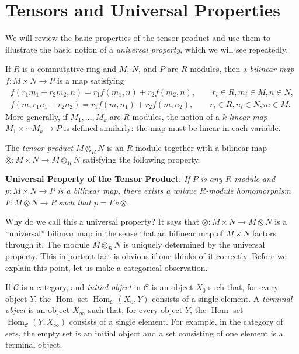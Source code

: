 \documentclass[12pt,reqno]{book}%
\theoremstyle{definition}
\theoremstyle{remark}
\theoremstyle{theorem}
\theoremstyle{remark}
\DeclareMathOperator{\Hom}{Hom}
\begin{document}
\chapter{Tensors and Universal Properties}\label{}%
We will review the basic properties of the tensor product and use them to illustrate the basic notion of a \emph{universal property}, which we will see repeatedly.

If $R$ is a commutative ring and $M$, $N$, and $P$ are $R$-modules, then a \emph{bilinear map} $f : M \times N \to P$ is a map satisfying
\begin{gather*}
    f(r_1m_1 + r_2m_2, n) = r_1f(m_1, n) + r_2f(m_2, n), \qquad r_i \in R, m_i \in M, n \in N,\\
    f(m, r_1n_1 + r_2n_2) = r_1f(m, n_1) + r_2f(m, n_2), \qquad r_i \in R, n_i \in N, m \in M.
\end{gather*}
More generally, if $M_1, \ldots, M_k$ are $R$-modules, the notion of a $k$-\emph{linear map} $M_1 \times \cdots M_k \to P$ is defined similarly: the map must be linear in each variable.

The \emph{tensor product} $M \otimes_R N$ is an $R$-module together with a bilinear map $\otimes : M \times N \to M \otimes_R N$ satisfying the following property.

\textbf{Universal Property of the Tensor Product.} \textit{If $P$ is any $R$-module and $p : M \times N \to P$ is a bilinear map, there exists a unique $R$-module homomorphism $F : M \otimes N \to P$ such that $p = F \circ \otimes$.}

Why do we call this a universal property?
It says that $\otimes : M \times N \to M \otimes N$ is a ``universal'' bilinear map in the sense that an bilinear map of $M \times N$ factors through it.
The module $M \otimes_R N$ is uniquely determined by the universal property.
This important fact is obvious if one thinks of it correctly.
Before we explain this point, let us make a categorical observation.

If $\mathcal{C}$ is a category, and \emph{initial object} in $\mathcal{C}$ is an object $X_0$ such that, for every object $Y$, the $\Hom$ set $\Hom_\mathcal{C}(X_0, Y)$ consists of a single element.
A \emph{terminal object} is an object $X_\infty$ such that, for every object $Y$, the $\Hom$ set $\Hom_\mathcal{C}(Y, X_\infty)$ consists of a single element.
For example, in the category of sets, the empty set is an initial object and a set consisting of one element is a terminal object.
\end{document}
